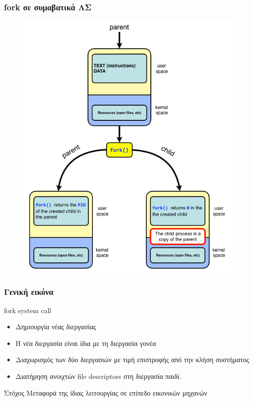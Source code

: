 \documentclass[red,slidestop,notes,compress,mathserif]{beamer}
\begin{document}
\begin{frame}
\frametitle{fork σε συμαβατικά ΛΣ}
\begin{figure}
\center
\includegraphics[scale=0.3]{figures/fork-details.png}
\end{figure}
\end{frame}

\begin{frame}
\frametitle{Γενική εικόνα}
\begin{block}{fork system call}
\begin{itemize}
\item Δημιουργία νέας διεργασίας
\item Η νέα διεργασία είναι ίδια με τη διεργασία γονέα
\item Διαχωρισμός των δύο διεργασιών με τιμή επιστροφής από την κλήση συστήματος
\item Διατήρηση ανοιχτών file descriptors στη διεργασία παιδί.
\end{itemize}
\end{block}
\begin{block}{Στόχος}
Μεταφορά της ίδιας λειτουργίας σε επίπεδο εικονικών μηχανών
\end{block}
\end{frame}
\end{document}
